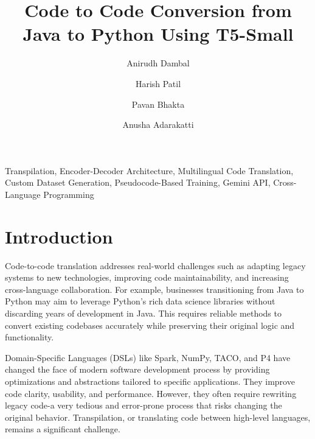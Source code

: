 \documentclass{dhbenelux}
\author[1]{Anirudh Dambal}
\author[1]{Harish Patil}
\author[1]{Pavan Bhakta}
\author[1]{Anusha Adarakatti}
\affil{School of Computer Science and Engineering,
KLE Technological University, Hubballi, Karnataka, India, 580031}
\title{Code to Code Conversion from Java to Python
Using T5-Small}
\begin{document}
\maketitle

\begin{abstract}
\end{abstract}

\begin{keywords}
    {Transpilation, Encoder-Decoder Architecture, Multilingual Code Translation, Custom Dataset Generation, Pseudocode-Based Training, Gemini API, Cross-Language Programming}
\end{keywords}
\section{Introduction}

Code-to-code translation addresses real-world challenges such as adapting legacy systems to new technologies, improving code maintainability, and increasing cross-language collaboration. For example, businesses transitioning from Java to Python may aim to leverage Python’s rich data science libraries without discarding years of development in Java. This requires reliable methods to convert existing codebases accurately while preserving their original logic and functionality.

Domain-Specific Languages (DSLs) like Spark, NumPy, TACO, and P4 have changed the face of modern software development process by providing optimizations and abstractions tailored to specific applications. They improve code clarity, usability, and performance. However, they often require rewriting legacy code-a very tedious and error-prone process that risks changing the original behavior. Transpilation, or translating code between high-level languages, remains a significant challenge.
\end{document}
